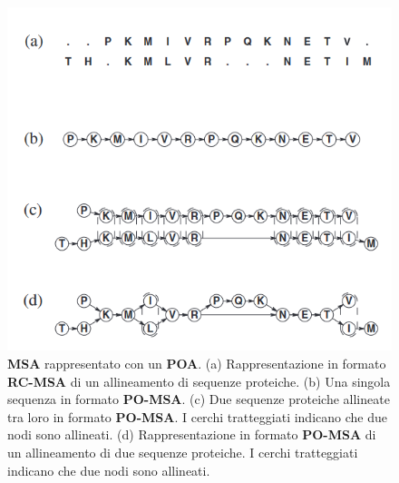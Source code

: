     \begin{figure}[ht]
        \centering
        \includegraphics{images/poa-construction.png}
        \caption{\textbf{MSA} rappresentato con un \textbf{POA}. (a) Rappresentazione in formato \textbf{RC-MSA} di un allineamento di sequenze proteiche. (b) Una singola sequenza in formato \textbf{PO-MSA}. (c) Due sequenze proteiche allineate tra loro in formato \textbf{PO-MSA}. I cerchi tratteggiati indicano che due nodi sono allineati. (d) Rappresentazione in formato \textbf{PO-MSA} di un allineamento di due sequenze proteiche. I cerchi tratteggiati indicano che due nodi sono allineati. \cite{POA}}
        \label{fig:poa_construction}
    \end{figure}

